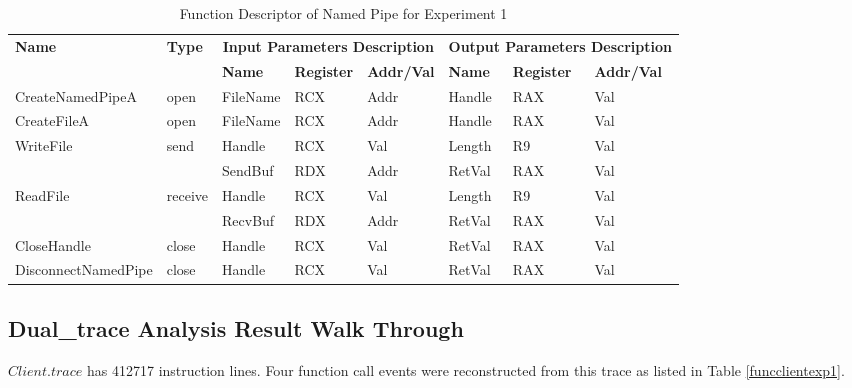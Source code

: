 \begin{table}[H]
  \centering
  \caption{Function Descriptor of Named Pipe for Experiment 1}
  \label{fdescexp1}
  \begin{tabular}{|l|l|l|l|l|l|l|l|}
\hline
             \multirow{2}{*}{{\textbf{Name}}} & \multirow{2}{*}{{\textbf{Type}}} & \multicolumn{3}{c|}{\textbf{Input Parameters Description}} & \multicolumn{3}{c|}{\textbf{Output Parameters Description}} \\
              \cline{3-8} 
             & & \textbf{Name}& \textbf{Register} & \textbf{Addr/Val} & \textbf{Name}& \textbf{Register} &  \textbf{Addr/Val}  \\
             \hline
      CreateNamedPipeA
       &open & FileName & RCX  & Addr &  Handle & RAX & Val\\
      \hline         
      CreateFileA
       &open & FileName & RCX & Addr&  Handle & RAX & Val\\ 
      \hline              
      \multirow{2}{*}{WriteFile}
       &\multirow{2}{*}{send} &  Handle & RCX & Val & Length& R9 &Val\\
        \cline{3-8} 
       & & SendBuf & RDX & Addr & RetVal& RAX & Val\\
      \hline            
      \multirow{2}{*}{ReadFile}
       &\multirow{2}{*}{receive} &  Handle & RCX & Val& Length &R9 & Val\\
        \cline{3-8} 
       & & RecvBuf & RDX  & Addr & RetVal& RAX & Val\\
      \hline            
      CloseHandle &
       close &  Handle & RCX & Val & RetVal& RAX & Val\\
      \hline            
      DisconnectNamedPipe &
      close &  Handle & RCX & Val & RetVal& RAX & Val\\
      \hline               
  \end{tabular}
\end{table}


\subsection{Dual\_trace Analysis Result Walk Through}
$Client.trace$ has 412717 instruction lines. Four function call events were reconstructed from this trace as listed in Table \ref{funcclientexp1}.


